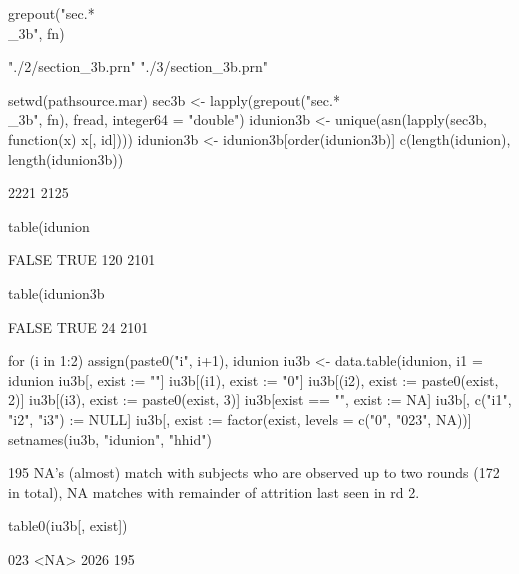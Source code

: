 \begin{Schunk}
\begin{Sinput}
grepout("sec.*\\_3b", fn)
\end{Sinput}
\begin{Soutput}
[1] "./2/section_3b.prn" "./3/section_3b.prn"
\end{Soutput}
\begin{Sinput}
setwd(pathsource.mar)
sec3b <- lapply(grepout("sec.*\\_3b", fn), fread, integer64 = "double")
idunion3b <- unique(asn(lapply(sec3b, function(x) x[, id])))
idunion3b <- idunion3b[order(idunion3b)]
c(length(idunion), length(idunion3b))
\end{Sinput}
\begin{Soutput}
[1] 2221 2125
\end{Soutput}
\begin{Sinput}
table(idunion %in% idunion3b)
\end{Sinput}
\begin{Soutput}

FALSE  TRUE 
  120  2101 
\end{Soutput}
\begin{Sinput}
table(idunion3b %in% idunion)
\end{Sinput}
\begin{Soutput}

FALSE  TRUE 
   24  2101 
\end{Soutput}
\begin{Sinput}
for (i in 1:2) assign(paste0("i", i+1), idunion %in% sec3b[[i]][, id])
iu3b <- data.table(idunion, i1 = idunion %in% idunion3b, i2, i3)
iu3b[, exist := ""]
iu3b[(i1), exist := "0"]
iu3b[(i2), exist := paste0(exist, 2)]
iu3b[(i3), exist := paste0(exist, 3)]
iu3b[exist == "", exist := NA]
iu3b[, c("i1", "i2", "i3") := NULL]
iu3b[, exist := factor(exist, levels = c("0", "023", NA))]
setnames(iu3b, "idunion", "hhid")
\end{Sinput}
\end{Schunk}
195 NA's (almost) match with subjects who are observed up to two rounds (172 in total), NA matches with remainder of attrition last seen in rd 2.
\begin{Schunk}
\begin{Sinput}
table0(iu3b[, exist])
\end{Sinput}
\begin{Soutput}

 023 <NA> 
2026  195 
\end{Soutput}
\end{Schunk}

